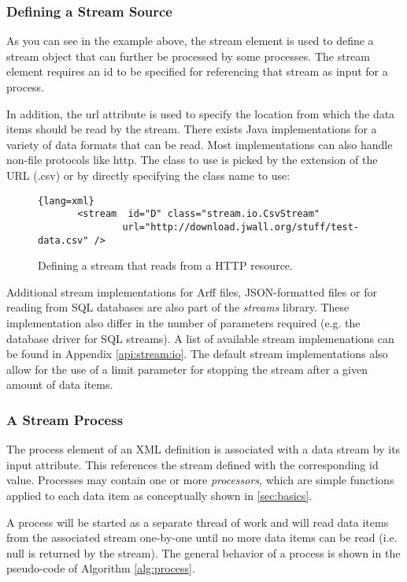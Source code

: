 \subsubsection{Defining a Stream Source}
As you can see in the example above, the {\ttfamily stream} element is used to define
a stream object that can further be processed by some processes. The {\ttfamily stream}
element requires an {\ttfamily id} to be specified for referencing that stream as input
for a process. 

In addition, the {\ttfamily url} attribute is used to specify the location
from which the data items should be read by the stream. There exists Java implementations
for a variety of data formats that can be read. Most implementations can also handle 
non-file protocols like {\ttfamily http}. The class to use is picked by the extension
of the URL ({\ttfamily .csv}) or by directly specifying the class name to use:
\begin{figure}[h!]{\footnotesize
    \centering
    \begin{lstlisting}{lang=xml}
       <stream  id="D" class="stream.io.CsvStream"
               url="http://download.jwall.org/stuff/test-data.csv" />
    \end{lstlisting}
    \caption{\label{fig:defStream}Defining a stream that reads from a HTTP resource.}
}
\end{figure}

Additional stream implementations for Arff files, JSON-formatted files or for reading 
from SQL databases are also part of the {\em streams} library. These implementation
also differ in the number of parameters required (e.g. the database driver for SQL
streams). A list of available stream implemenations can be found in Appendix \ref{api:stream:io}.
The default stream implementations also allow for the use of a {\ttfamily limit} parameter
for stopping the stream after a given amount of data items.

\subsubsection{A Stream Process}
The {\ttfamily process} element of an XML definition is associated with a data stream
by its {\ttfamily input} attribute. This references the stream defined with the corresponding
{\ttfamily id} value. Processes may contain one or more {\em processors}, which are simple
functions applied to each data item as conceptually shown in \ref{sec:basics}.

A process will be started as a separate thread of work and will read data items from
the associated stream one-by-one until no more data items can be read (i.e. 
{\ttfamily null} is returned by the stream). The general behavior of a process is
shown in the pseudo-code of Algorithm \ref{alg:process}.

